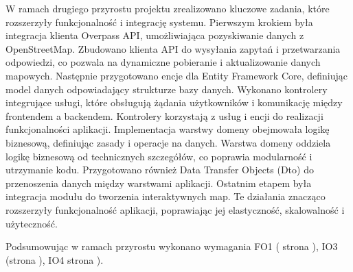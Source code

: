     W ramach drugiego przyrostu projektu zrealizowano kluczowe zadania, które rozszerzyły funkcjonalność i integrację systemu. \newline
    \indent Pierwszym krokiem była integracja klienta Overpass API, umożliwiająca pozyskiwanie danych z OpenStreetMap. Zbudowano klienta API do wysyłania zapytań i przetwarzania odpowiedzi, co pozwala na dynamiczne pobieranie i aktualizowanie danych mapowych.\newline
    \indent Następnie przygotowano encje dla Entity Framework Core, definiując model danych odpowiadający strukturze bazy danych.
    Wykonano kontrolery integrujące usługi, które obsługują żądania użytkowników i komunikację między frontendem a backendem. Kontrolery korzystają z usług i encji do realizacji funkcjonalności aplikacji.\newline
    \indent Implementacja warstwy domeny obejmowała logikę biznesową, definiując zasady i operacje na danych. Warstwa domeny oddziela logikę biznesową od technicznych szczegółów, co poprawia modularność i utrzymanie kodu.\newline
    \indent Przygotowano również Data Transfer Objects (Dto) do przenoszenia danych między warstwami aplikacji.    \newline
    \indent Ostatnim etapem była integracja modułu   do tworzenia interaktywnych map.\newline
    Te działania znacząco rozszerzyły funkcjonalność aplikacji, poprawiając jej elastyczność, skalowalność i użyteczność.\newline

    Podsumowując w ramach przyrostu wykonano wymagania FO1 ( strona \pageref{tab:requirements:func1}), IO3 (strona \pageref{tab:requirements:env3}), IO4 strona \pageref{tab:requirements:env4}).

